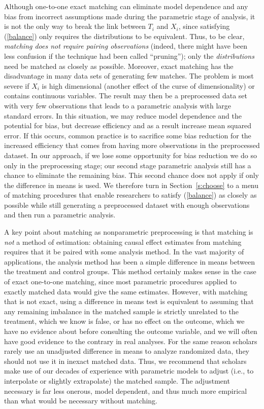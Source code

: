 \documentclass[11pt,titlepage]{article}
\begin{document}
Although one-to-one exact matching can eliminate model dependence and
any bias from incorrect assumptions made during the parametric stage
of analysis, it is not the only way to break the link between $T_i$
and $X_i$, since satisfying (\ref{balance}) only requires the
distributions to be equivalent.  Thus, to be clear, \emph{matching
  does not require pairing observations} (indeed, there might have
been less confusion if the technique had been called ``pruning'');
only the \emph{distributions} need be matched as closely as possible.
Moreover, exact matching has the disadvantage in many data sets of 
generating few matches.  The problem is most severe if $X_i$ is high
dimensional (another effect of the curse of dimensionality) or
contains continuous variables.  The result may then be a preprocessed
data set with very few observations that leads to a parametric analysis
with large standard errors.  In this situation, we may reduce model
dependence and the potential for bias, but decrease efficiency and as
a result increase mean squared error.  If this occurs, common practice
is to sacrifice some bias reduction for the increased efficiency that
comes from having more observations in the preprocessed dataset.  In
our approach, if we lose some opportunity for bias reduction we do so
only in the preprocessing stage; our second stage parametric analysis
still has a chance to eliminate the remaining bias.  This second
chance does not apply if only the difference in means is used.  We
therefore turn in Section~\ref{s:choose} to a menu of matching
procedures that enable researchers to satisfy (\ref{balance}) as
closely as possible while still generating a preprocessed dataset with
enough observations and then run a parametric analysis.

A key point about matching as nonparametric preprocessing is that
matching is \emph{not} a method of estimation: obtaining causal effect
estimates from matching requires that it be paired with some analysis
method.  In the vast majority of applications, the analysis method has
been a simple difference in means between the treatment and control
groups.  This method certainly makes sense in the case of exact
one-to-one matching, since most parametric procedures applied to
exactly matched data would give the same estimates.  However, with
matching that is not exact, using a difference in means test is
equivalent to assuming that any remaining imbalance in the matched
sample is strictly unrelated to the treatment, which we know is false,
or has no effect on the outcome, which we have no evidence about
before consulting the outcome variable, and we will often have good
evidence to the contrary in real analyses.  For the same reason
scholars rarely use an unadjusted difference in means to analyze
randomized data, they should not use it in inexact matched data.
Thus, we recommend that scholars make use of our decades of experience
with parametric models to adjust (i.e., to interpolate or slightly
extrapolate) the matched sample.  The adjustment necessary is far less
onerous, model dependent, and thus much more empirical than what would
be necessary without matching.
\end{document}
